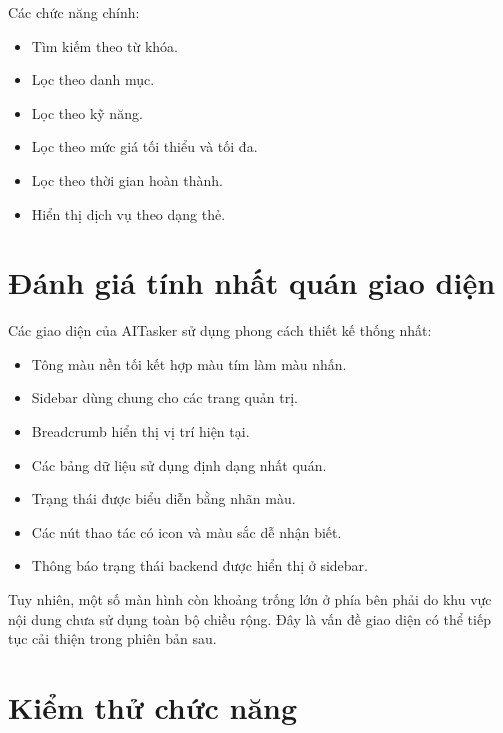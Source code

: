 Các chức năng chính:

\begin{itemize}
    \item Tìm kiếm theo từ khóa.
    \item Lọc theo danh mục.
    \item Lọc theo kỹ năng.
    \item Lọc theo mức giá tối thiểu và tối đa.
    \item Lọc theo thời gian hoàn thành.
    \item Hiển thị dịch vụ theo dạng thẻ.
\end{itemize}

\section{Đánh giá tính nhất quán giao diện}
\label{sec:ui-consistency}

Các giao diện của AITasker sử dụng phong cách thiết kế thống nhất:

\begin{itemize}
    \item Tông màu nền tối kết hợp màu tím làm màu nhấn.
    \item Sidebar dùng chung cho các trang quản trị.
    \item Breadcrumb hiển thị vị trí hiện tại.
    \item Các bảng dữ liệu sử dụng định dạng nhất quán.
    \item Trạng thái được biểu diễn bằng nhãn màu.
    \item Các nút thao tác có icon và màu sắc dễ nhận biết.
    \item Thông báo trạng thái backend được hiển thị ở sidebar.
\end{itemize}

Tuy nhiên, một số màn hình còn khoảng trống lớn ở phía bên phải do khu vực nội dung chưa sử dụng toàn bộ chiều rộng. Đây là vấn đề giao diện có thể tiếp tục cải thiện trong phiên bản sau.

\section{Kiểm thử chức năng}
\label{sec:functional-testing-chapter6}

